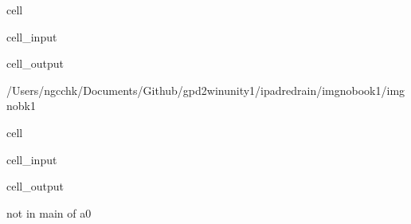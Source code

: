 \documentclass[letterpaper,10pt,english]{jupyterBook}
\begin{document}
\begin{sphinxuseclass}{cell}\begin{sphinxVerbatimInput}

\begin{sphinxuseclass}{cell_input}
\begin{sphinxVerbatim}[commandchars=\\\{\}]
 

\end{sphinxVerbatim}

\end{sphinxuseclass}\end{sphinxVerbatimInput}
\begin{sphinxVerbatimOutput}

\begin{sphinxuseclass}{cell_output}
\begin{sphinxVerbatim}[commandchars=\\\{\}]
/Users/ngcchk/Documents/Github/gpd2\PYGZhy{}win\PYGZhy{}unity1/ipadred\PYGZhy{}rain/imgno\PYGZus{}book1/imgnobk1
\end{sphinxVerbatim}

\end{sphinxuseclass}\end{sphinxVerbatimOutput}

\end{sphinxuseclass}
\begin{sphinxuseclass}{cell}\begin{sphinxVerbatimInput}

\begin{sphinxuseclass}{cell_input}
\begin{sphinxVerbatim}[commandchars=\\\{\}]
 
\end{sphinxVerbatim}

\end{sphinxuseclass}\end{sphinxVerbatimInput}
\begin{sphinxVerbatimOutput}

\begin{sphinxuseclass}{cell_output}
\begin{sphinxVerbatim}[commandchars=\\\{\}]
not in main of a0
\end{sphinxVerbatim}

\end{sphinxuseclass}\end{sphinxVerbatimOutput}

\end{sphinxuseclass}
\end{document}
